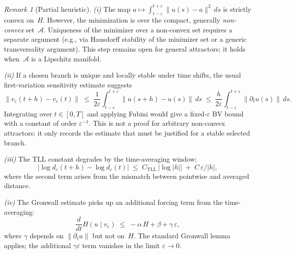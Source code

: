 \documentclass[12pt,a4paper]{article}
\theoremstyle{definition}
\theoremstyle{plain}
\theoremstyle{remark}
\newtheorem{remark}[definition]{Remark}
\begin{document}
\begin{remark}[Partial heuristic]
\emph{(i)}\; The map
$a \mapsto \int_{t-\varepsilon}^{t+\varepsilon} \|u(s)-a\|^2\,ds$
is strictly convex on~$H$.  However, the minimization is over the
compact, generally \emph{non-convex} set~$\mathcal{A}$.  Uniqueness
of the minimizer over a non-convex set requires a separate argument
(e.g., via Hausdorff stability of the minimizer set or a generic
transversality argument).  This step remains open for general
attractors; it holds when~$\mathcal{A}$ is a Lipschitz manifold.

\emph{(ii)}\; If a chosen branch is unique and locally stable under
time shifts, the usual first-variation sensitivity estimate suggests
\[
  \|v_\varepsilon(t+h) - v_\varepsilon(t)\|
  \;\le\;
  \frac{1}{2\varepsilon}
  \int_{t-\varepsilon}^{t+\varepsilon}
  \|u(s+h) - u(s)\|\,ds
  \;\le\;
  \frac{h}{2\varepsilon}
  \int_{t-\varepsilon}^{t+\varepsilon}
  \|\partial_t u(s)\|\,ds.
\]
Integrating over $t \in [0,T]$ and applying Fubini would give a
fixed-\(\varepsilon\) BV bound with a constant of order
$\varepsilon^{-1}$.  This is not a proof for arbitrary non-convex
attractors; it only records the estimate that must be justified for a
stable selected branch.

\emph{(iii)}\; The TLL constant degrades by the time-averaging window:
\[
  |\log d_\varepsilon(t+h) - \log d_\varepsilon(t)|
  \;\le\;
  C_{\mathrm{TLL}}\,|\log|h||
  \;+\;
  C\,\varepsilon/|h|,
\]
where the second term arises from the mismatch between pointwise and
averaged distance.

\emph{(iv)}\; The Gronwall estimate picks up an additional forcing
term from the time-averaging:
\[
  \frac{d}{dt} H(u \mid v_\varepsilon)
  \;\le\;
  -\alpha\,H + \beta + \gamma\,\varepsilon,
\]
where $\gamma$ depends on $\|\partial_t u\|$ but not on~$H$.
The standard Gronwall lemma applies; the additional
$\gamma\varepsilon$ term vanishes in the limit
$\varepsilon \to 0$.
\end{remark}
\end{document}
